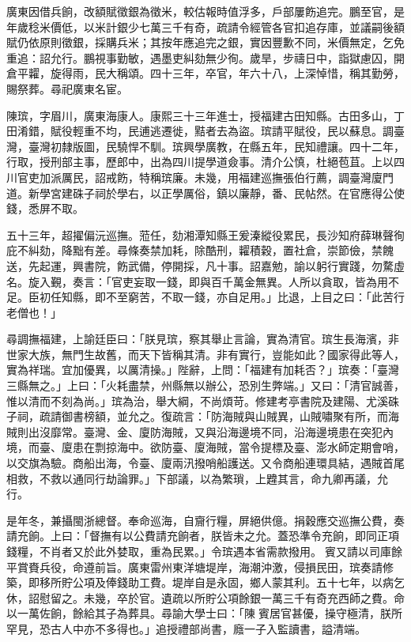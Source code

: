 \begin{pinyinscope}
廣東因借兵餉，改額賦徵銀為徵米，較估報時值浮多，戶部屢飭追完。鵬至官，是年歲稔米價低，以米計銀少七萬三千有奇，疏請令經管各官扣追存庫，並議嗣後額賦仍依原則徵銀，採購兵米；其按年應追完之銀，實因豐歉不同，米價無定，乞免重追：詔允行。鵬視事勤敏，遇墨吏糾劾無少徇。歲旱，步禱日中，詣獄慮囚，開倉平糶，旋得雨，民大稱頌。四十三年，卒官，年六十八，上深悼惜，稱其勤勞，賜祭葬。尋祀廣東名宦。

陳瑸，字眉川，廣東海康人。康熙三十三年進士，授福建古田知縣。古田多山，丁田淆錯，賦役輕重不均，民逋逃遷徙，黠者去為盜。瑸請平賦役，民以蘇息。調臺灣，臺灣初隸版圖，民驍悍不馴。瑸興學廣教，在縣五年，民知禮讓。四十二年，行取，授刑部主事，歷郎中，出為四川提學道僉事。清介公慎，杜絕苞苴。上以四川官吏加派厲民，詔戒飭，特稱瑸廉。未幾，用福建巡撫張伯行薦，調臺灣廈門道。新學宮建硃子祠於學右，以正學厲俗，鎮以廉靜，番、民帖然。在官應得公使錢，悉屏不取。

五十三年，超擢偏沅巡撫。蒞任，劾湘潭知縣王爰溱縱役累民，長沙知府薛琳聲徇庇不糾劾，降黜有差。尋條奏禁加耗，除酷刑，糶積穀，置社倉，崇節儉，禁餽送，先起運，興書院，飭武備，停開採，凡十事。詔嘉勉，諭以躬行實踐，勿騖虛名。旋入覲，奏言：「官吏妄取一錢，即與百千萬金無異。人所以貪取，皆為用不足。臣初任知縣，即不至窮苦，不取一錢，亦自足用。」比退，上目之曰：「此苦行老僧也！」

尋調撫福建，上諭廷臣曰：「朕見瑸，察其舉止言論，實為清官。瑸生長海濱，非世家大族，無門生故舊，而天下皆稱其清。非有實行，豈能如此？國家得此等人，實為祥瑞。宜加優異，以厲清操。」陛辭，上問：「福建有加耗否？」瑸奏：「臺灣三縣無之。」上曰：「火耗盡禁，州縣無以辦公，恐別生弊端。」又曰：「清官誠善，惟以清而不刻為尚。」瑸為治，舉大綱，不尚煩苛。修建考亭書院及建陽、尤溪硃子祠，疏請御書榜額，並允之。復疏言：「防海賊與山賊異，山賊嘯聚有所，而海賊則出沒靡常。臺灣、金、廈防海賊，又與沿海邊境不同，沿海邊境患在突犯內境，而臺、廈患在剽掠海中。欲防臺、廈海賊，當令提標及臺、澎水師定期會哨，以交旗為驗。商船出海，令臺、廈兩汛撥哨船護送。又令商船連環具結，遇賊首尾相救，不救以通同行劫論罪。」下部議，以為繁瑣，上韙其言，命九卿再議，允行。

是年冬，兼攝閩浙總督。奉命巡海，自齎行糧，屏絕供億。捐穀應交巡撫公費，奏請充餉。上曰：「督撫有以公費請充餉者，朕皆未之允。蓋恐準令充餉，即同正項錢糧，不肖者又於此外婪取，重為民累。」令瑸遇本省需款撥用。賓又請以司庫餘平賞賚兵役，命遵前旨。廣東雷州東洋塘堤岸，海潮沖激，侵損民田，瑸奏請修築，即移所貯公項及俸錢助工費。堤岸自是永固，鄉人蒙其利。五十七年，以病乞休，詔慰留之。未幾，卒於官。遺疏以所貯公項餘銀一萬三千有奇充西師之費。命以一萬佐餉，餘給其子為葬具。尋諭大學士曰：「陳賓居官甚優，操守極清，朕所罕見，恐古人中亦不多得也。」追授禮部尚書，廕一子入監讀書，謚清端。


\end{pinyinscope}
